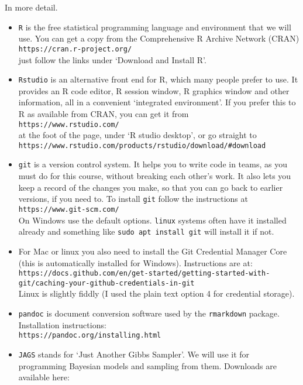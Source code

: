 \documentclass[10pt] {article}
\theoremstyle{definition}
\begin{document}
In more detail.
\begin{itemize}
\item {\tt R} is the free statistical programming language and environment that we will use. You can get a copy from the Comprehensive R Archive Network (CRAN)\\
\lstinline+https://cran.r-project.org/+\\
just follow the links under `Download and Install R'. 
\item {\tt Rstudio} is an alternative front end for R, which many people prefer to use. It provides an R code editor, R session window, R graphics window and other information, all in a convenient `integrated environment'. If you prefer this to R as available from CRAN, you can get it from\\
\lstinline+https://www.rstudio.com/+\\
at the foot of the page, under `R studio desktop', or go straight to \\
\lstinline+https://www.rstudio.com/products/rstudio/download/#download+
\item {\tt git} is a version control system. It helps you to write code in teams, as you must do for this course, without breaking each other's work. It also lets you keep a record of the changes you make, so that you can go back to earlier versions, if you need to. To install {\tt git} follow the instructions at\\
\lstinline+https://www.git-scm.com/+\\
On Windows use the default options. {\tt linux} systems often have it installed already and something like \lstinline+sudo apt install git+ will install it if not. 
\item For Mac or linux you also need to install the Git Credential Manager Core (this is automatically installed for Windows). Instructions are at:\\
{\scriptsize \verb+https://docs.github.com/en/get-started/getting-started-with-git/caching-your-github-credentials-in-git+}\\
Linux is slightly fiddly (I used the plain text option 4 for credential storage). 
\item {\tt pandoc} is document conversion software used by the {\tt rmarkdown} package. Installation instructions:\\
\lstinline+https://pandoc.org/installing.html+ 
\item {\tt JAGS} stands for `Just Another Gibbs Sampler'. We will use it for programming Bayesian models and sampling from them. Downloads are available here:\\

\end{itemize}
\end{document}
